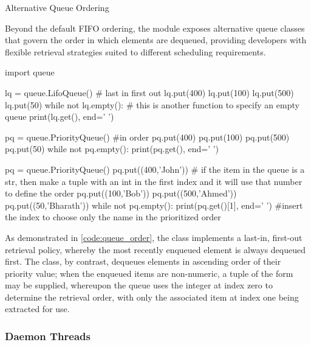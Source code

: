 \documentclass[10pt]{article}
\begin{document}
      \begin{core}{Alternative Queue Ordering}

        Beyond the default FIFO ordering, the  module exposes alternative queue classes that govern the order in which elements are dequeued, providing developers with flexible retrieval strategies suited to different scheduling requirements.

        \begin{pyconsole}

          import queue

          lq = queue.LifoQueue() # last in first out
          lq.put(400)
          lq.put(100)
          lq.put(500)
          lq.put(50)
          while not lq.empty(): # this is another function to specify an empty queue
              print(lq.get(), end=' ')



          pq = queue.PriorityQueue() #in order
          pq.put(400)
          pq.put(100)
          pq.put(500)
          pq.put(50)
          while not pq.empty():
              print(pq.get(), end=' ')



          pq = queue.PriorityQueue()
          pq.put((400,'John')) # if the item in the queue is a str, then make a tuple with an int in the first index and it will use that number to define the order
          pq.put((100,'Bob'))
          pq.put((500,'Ahmed'))
          pq.put((50,'Bharath'))
          while not pq.empty():
              print(pq.get()[1], end=' ') #insert the index to choose only the name in the prioritized order

        \end{pyconsole}

        As demonstrated in \autoref{code:queue_order}, the  class implements a last-in, first-out retrieval policy, whereby the most recently enqueued element is always dequeued first. The  class, by contrast, dequeues elements in ascending order of their priority value; when the enqueued items are non-numeric, a tuple of the form  may be supplied, whereupon the queue uses the integer at index zero to determine the retrieval order, with only the associated item at index one being extracted for use.

      \end{core}

    \subsubsection{Daemon Threads}
\end{document}
